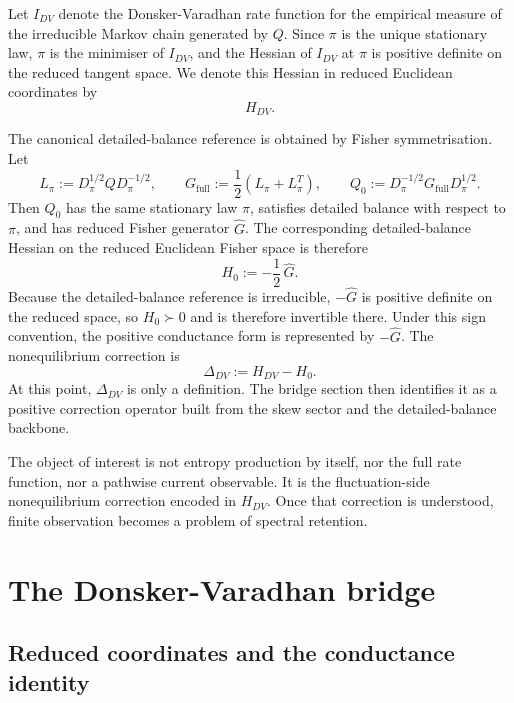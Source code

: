 \documentclass[11pt,a4paper]{article}
\numberwithin{equation}{section}
\theoremstyle{thmcompact}
\theoremstyle{remark}
\begin{document}
Let \(I_{DV}\) denote the Donsker-Varadhan rate function for the empirical measure of the irreducible Markov chain generated by \(Q\). Since \(\pi\) is the unique stationary law, \(\pi\) is the minimiser of \(I_{DV}\), and the Hessian of \(I_{DV}\) at \(\pi\) is positive definite on the reduced tangent space. We denote this Hessian in reduced Euclidean coordinates by
\begin{equation}
H_{DV}.
\end{equation}

The canonical detailed-balance reference is obtained by Fisher symmetrisation. Let
\begin{equation}
L_\pi:=D_\pi^{1/2}QD_\pi^{-1/2},
\qquad
G_{\mathrm{full}}:=\frac12(L_\pi+L_\pi^T),
\qquad
Q_0:=D_\pi^{-1/2}G_{\mathrm{full}}D_\pi^{1/2}.
\end{equation}
Then \(Q_0\) has the same stationary law \(\pi\), satisfies detailed balance with respect to \(\pi\), and has reduced Fisher generator \(\widehat G\). The corresponding detailed-balance Hessian on the reduced Euclidean Fisher space is therefore
\begin{equation}
H_0:=-\frac12\,\widehat G.
\end{equation}
Because the detailed-balance reference is irreducible, \(-\widehat G\) is positive definite on the reduced space, so \(H_0\succ 0\) and is therefore invertible there. Under this sign convention, the positive conductance form is represented by \(-\widehat G\).
The nonequilibrium correction is
\begin{equation}
\Delta_{DV}:=H_{DV}-H_0.
\end{equation}
At this point, \(\Delta_{DV}\) is only a definition. The bridge section then identifies it as a positive correction operator built from the skew sector and the detailed-balance backbone.

The object of interest is not entropy production by itself, nor the full rate function, nor a pathwise current observable. It is the fluctuation-side nonequilibrium correction encoded in \(H_{DV}\). Once that correction is understood, finite observation becomes a problem of spectral retention.

\section{The Donsker-Varadhan bridge}
\label{sec:exact-dv-bridge}

\subsection{Reduced coordinates and the conductance identity}
\end{document}
